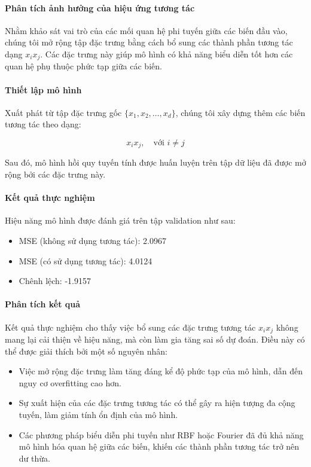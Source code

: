 \paragraph{Phân tích ảnh hưởng của hiệu ứng tương tác}

Nhằm khảo sát vai trò của các mối quan hệ phi tuyến giữa các biến đầu vào, chúng tôi mở rộng tập đặc trưng bằng cách bổ sung các thành phần tương tác dạng $x_i x_j$. Các đặc trưng này giúp mô hình có khả năng biểu diễn tốt hơn các quan hệ phụ thuộc phức tạp giữa các biến.

\paragraph{Thiết lập mô hình}

Xuất phát từ tập đặc trưng gốc $\{x_1, x_2, \dots, x_d\}$, chúng tôi xây dựng thêm các biến tương tác theo dạng:

\begin{equation}
x_i x_j, \quad \text{với } i \neq j
\end{equation}

Sau đó, mô hình hồi quy tuyến tính được huấn luyện trên tập dữ liệu đã được mở rộng bởi các đặc trưng này.

\paragraph{Kết quả thực nghiệm}

Hiệu năng mô hình được đánh giá trên tập validation như sau:

\begin{itemize}
    \item MSE (không sử dụng tương tác): 2.0967
    \item MSE (có sử dụng tương tác): 4.0124
    \item Chênh lệch: -1.9157
\end{itemize}

\paragraph{Phân tích kết quả}

Kết quả thực nghiệm cho thấy việc bổ sung các đặc trưng tương tác $x_i x_j$ không mang lại cải thiện về hiệu năng, mà còn làm gia tăng sai số dự đoán. Điều này có thể được giải thích bởi một số nguyên nhân:

\begin{itemize}
    \item Việc mở rộng đặc trưng làm tăng đáng kể độ phức tạp của mô hình, dẫn đến nguy cơ overfitting cao hơn.
    \item Sự xuất hiện của các đặc trưng tương tác có thể gây ra hiện tượng đa cộng tuyến, làm giảm tính ổn định của mô hình.
    \item Các phương pháp biểu diễn phi tuyến như RBF hoặc Fourier đã đủ khả năng mô hình hóa quan hệ giữa các biến, khiến các thành phần tương tác trở nên dư thừa.
\end{itemize}

